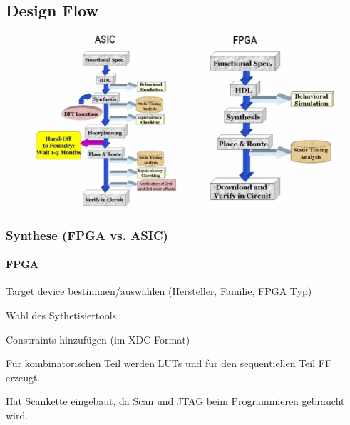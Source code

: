 \subsection{Design Flow}
\begin{figure}[H]
    \includegraphics[width=1\textwidth]{images/ASIC_FPGA.png}
\end{figure}
\subsubsection{Synthese (FPGA vs. ASIC)}
\paragraph{FPGA}
\begin{compactitem}
    \item Target device bestimmen/auswählen (Hersteller, Familie, FPGA Typ)
    \item Wahl des Sythetisiertools
    \item Constraints hinzufügen (im XDC-Format) 
    \item Für kombinatorischen Teil werden LUTs und für den sequentiellen Teil FF erzeugt. 
    \item Hat Scankette eingebaut, da Scan und JTAG beim Programmieren gebraucht wird.
\end{compactitem}
